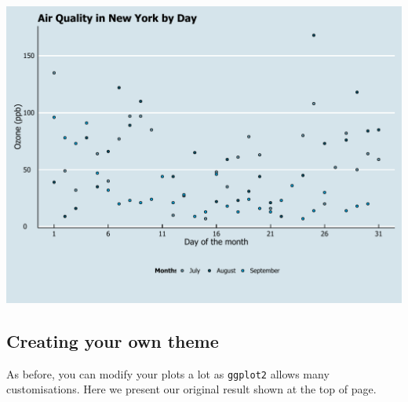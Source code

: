 \documentclass[]{article}
\begin{document}
\begin{center}\includegraphics{0_all_posts_pdf/scatter_14-1} \end{center}

\subsection{Creating your own theme}\label{creating-your-own-theme-4}

As before, you can modify your plots a lot as \texttt{ggplot2} allows
many customisations. Here we present our original result shown at the
top of page.
\end{document}
